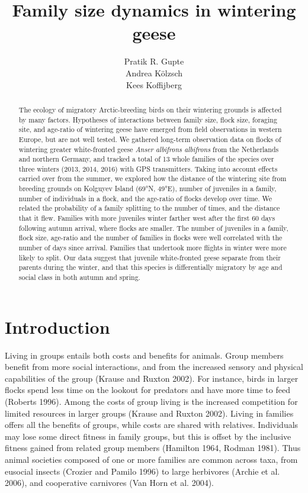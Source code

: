 \documentclass[10pt,twocolumn]{paper}
\title{Family size dynamics in wintering geese}
\author{Pratik R. Gupte \\ Andrea Kölzsch \\ Kees Koffijberg}
\date{}
\begin{document}
\maketitle
\begin{abstract}
The ecology of migratory Arctic-breeding birds on their wintering
grounds is affected by many factors. Hypotheses of interactions between
family size, flock size, foraging site, and age-ratio of wintering geese
have emerged from field observations in western Europe, but are not well
tested. We gathered long-term observation data on flocks of wintering
greater white-fronted geese \emph{Anser albifrons albifrons} from the
Netherlands and northern Germany, and tracked a total of 13 whole
families of the species over three winters (2013, 2014, 2016) with GPS
transmitters. Taking into account effects carried over from the summer,
we explored how the distance of the wintering site from breeding grounds
on Kolguyev Island (69°N, 49°E), number of juveniles in a family, number
of individuals in a flock, and the age-ratio of flocks develop over
time. We related the probability of a family splitting to the number of
times, and the distance that it flew. Families with more juveniles
winter farther west after the first 60 days following autumn arrival,
where flocks are smaller. The number of juveniles in a family, flock
size, age-ratio and the number of families in flocks were well
correlated with the number of days since arrival. Families that
undertook more flights in winter were more likely to split. Our data
suggest that juvenile white-fronted geese separate from their parents
during the winter, and that this species is differentially migratory by
age and social class in both autumn and spring.
\end{abstract}

\section{Introduction}\label{introduction}

Living in groups entails both costs and benefits for animals. Group
members benefit from more social interactions, and from the increased
sensory and physical capabilities of the group (Krause and Ruxton 2002).
For instance, birds in larger flocks spend less time on the lookout for
predators and have more time to feed (Roberts 1996). Among the costs of
group living is the increased competition for limited resources in
larger groups (Krause and Ruxton 2002). Living in families offers all
the benefits of groups, while costs are shared with relatives.
Individuals may lose some direct fitness in family groups, but this is
offset by the inclusive fitness gained from related group members
(Hamilton 1964, Rodman 1981). Thus animal societies composed of one or
more families are common across taxa, from eusocial insects (Crozier and
Pamilo 1996) to large herbivores (Archie et al. 2006), and cooperative
carnivores (Van Horn et al. 2004).
\end{document}
